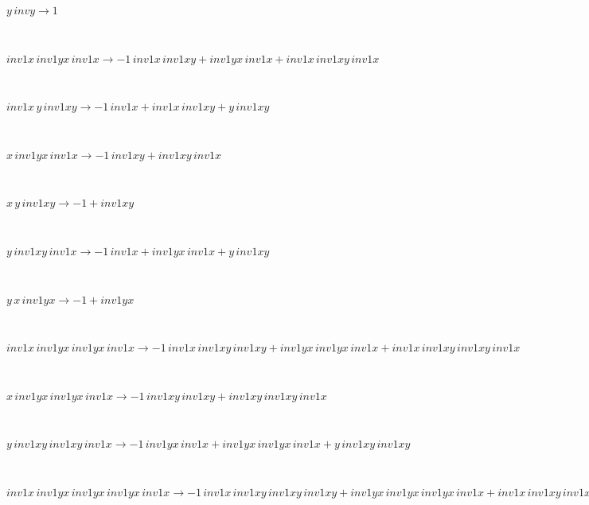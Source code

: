 \documentclass[rep10,leqno]{report}
\begin{document}
\begin{minipage}{6in}
$
y\,
 invy\rightarrow 1
$
\end{minipage}\medskip \\
\begin{minipage}{6in}
$
inv1x\,
 inv1yx\,
 inv1x\rightarrow -1\,
 inv1x\,
 inv1xy + inv1yx\,
 inv1x + inv1x\,
 inv1xy\,
 inv1x
$
\end{minipage}\medskip \\
\begin{minipage}{6in}
$
inv1x\,
 y\,
 inv1xy\rightarrow -1\,
 inv1x + inv1x\,
 inv1xy + y\,
 inv1xy
$
\end{minipage}\medskip \\
\begin{minipage}{6in}
$
x\,
 inv1yx\,
 inv1x\rightarrow -1\,
 inv1xy + inv1xy\,
 inv1x
$
\end{minipage}\medskip \\
\begin{minipage}{6in}
$
x\,
 y\,
 inv1xy\rightarrow -1 + inv1xy
$
\end{minipage}\medskip \\
\begin{minipage}{6in}
$
y\,
 inv1xy\,
 inv1x\rightarrow -1\,
 inv1x + inv1yx\,
 inv1x + y\,
 inv1xy
$
\end{minipage}\medskip \\
\begin{minipage}{6in}
$
y\,
 x\,
 inv1yx\rightarrow -1 + inv1yx
$
\end{minipage}\medskip \\
\begin{minipage}{6in}
$
inv1x\,
 inv1yx\,
 inv1yx\,
 inv1x\rightarrow -1\,
 inv1x\,
 inv1xy\,
 inv1xy + inv1yx\,
 inv1yx\,
 inv1x + inv1x\,
 inv1xy\,
 inv1xy\,
 inv1x
$
\end{minipage}\medskip \\
\begin{minipage}{6in}
$
x\,
 inv1yx\,
 inv1yx\,
 inv1x\rightarrow -1\,
 inv1xy\,
 inv1xy + inv1xy\,
 inv1xy\,
 inv1x
$
\end{minipage}\medskip \\
\begin{minipage}{6in}
$
y\,
 inv1xy\,
 inv1xy\,
 inv1x\rightarrow -1\,
 inv1yx\,
 inv1x + inv1yx\,
 inv1yx\,
 inv1x + y\,
 inv1xy\,
 inv1xy
$
\end{minipage}\medskip \\
\begin{minipage}{6in}
$
inv1x\,
 inv1yx\,
 inv1yx\,
 inv1yx\,
 inv1x\rightarrow -1\,
 inv1x\,
 inv1xy\,
 inv1xy\,
 inv1xy + inv1yx\,
 inv1yx\,
 inv1yx\,
 inv1x + inv1x\,
 inv1xy\,
 inv1xy\,
 inv1xy\,
 inv1x
$
\end{minipage}\medskip \\
\end{document}
